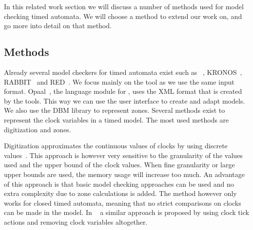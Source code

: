 In this related work section we will discuss a number of methods used for model checking timed automata. We will choose a method to extend our work on, and go more into detail on that method.

\subsection{Methods}
Already several model checkers for timed automata exist such as \uppaal{}~\cite{UPPAAL}, KRONOS~\cite{kronos}, RABBIT~\cite{CAV03} and RED~\cite{crds}. We focus mainly on the \uppaal{} tool as we use the same input format. Opaal~\cite{opaal}, the language module for \ltsmin{}, uses the XML format that is created by the \uppaal{} tools. This way we can use the \uppaal{} user interface to create and adapt models. We also use the \uppaal{} DBM library to represent zones. Several methods exist to represent the clock variables in a timed model. The most used methods are digitization and zones. 

Digitization approximates the continuous values of clocks by using discrete values~\cite{CHARME01}. This approach is however very sensitive to the granularity of the values used and the upper bound of the clock values. When fine granularity or large upper bounds are used, the memory usage will increase too much. An advantage of this approach is that basic model checking approaches can be used and no extra complexity due to zone calculations is added. The method however only works for closed timed automata, meaning that no strict comparisons on clocks can be made in the model. In ~\cite{nguyen2012discrete} a similar approach is proposed by using clock tick actions and removing clock variables altogether. 

